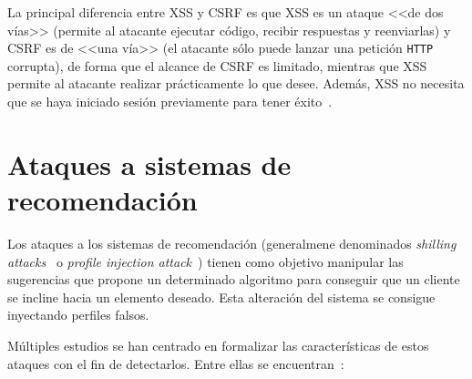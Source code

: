 La principal diferencia entre XSS y CSRF es que XSS es un ataque <<de dos vías>> (permite al atacante ejecutar código, recibir respuestas y reenviarlas) y CSRF es de <<una vía>> (el atacante sólo puede lanzar una petición \texttt{HTTP} corrupta), de forma que el alcance de CSRF es limitado, mientras que XSS permite al atacante realizar prácticamente lo que desee. Además, XSS no necesita que se haya iniciado sesión previamente para tener éxito~\cite{xssVsCSRF}.

\section{Ataques a sistemas de recomendación}

Los ataques a los sistemas de recomendación (generalmene denominados \textit{shilling attacks}~\cite{mingdan2018ShillingAttacksAReview} o \textit{profile injection attack}~\cite{Mobasher2006Thesis}) tienen como objetivo manipular las sugerencias que propone un determinado algoritmo para conseguir que un cliente se incline hacia un elemento deseado. Esta alteración del sistema se consigue inyectando perfiles falsos.

Múltiples estudios se han centrado en formalizar las características de estos ataques con el fin de detectarlos. Entre ellas se encuentran~\cite{mingdan2018ShillingAttacksAReview}:

